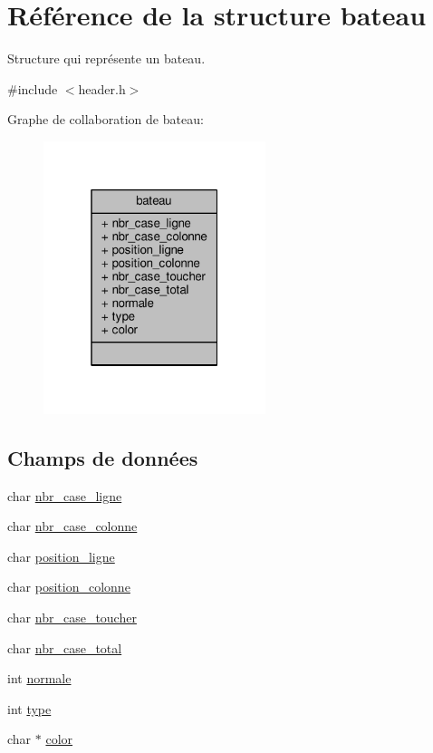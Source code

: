 \hypertarget{structbateau}{}\section{Référence de la structure bateau}
\label{structbateau}


Structure qui représente un bateau.  




{\ttfamily \#include $<$header.\+h$>$}



Graphe de collaboration de bateau\+:\nopagebreak
\begin{figure}[H]
\begin{center}
\leavevmode
\includegraphics[width=184pt]{structbateau__coll__graph}
\end{center}
\end{figure}
\subsection*{Champs de données}
\begin{DoxyCompactItemize}
\item 
char \mbox{\hyperlink{structbateau_a5f7637b2932717e5589e1a368dd1b47b}{nbr\+\_\+case\+\_\+ligne}}
\item 
char \mbox{\hyperlink{structbateau_a1a56dd379e7c5cfc5714fd204947a0a8}{nbr\+\_\+case\+\_\+colonne}}
\item 
char \mbox{\hyperlink{structbateau_a5dcd33e534b9b1b8b0414325bc5c09b1}{position\+\_\+ligne}}
\item 
char \mbox{\hyperlink{structbateau_aac775edde7cde57176e580c29f6e8eca}{position\+\_\+colonne}}
\item 
char \mbox{\hyperlink{structbateau_a62ae80832c521a9984c520fde88dadfd}{nbr\+\_\+case\+\_\+toucher}}
\item 
char \mbox{\hyperlink{structbateau_aff445dc58a52069759f1e4bfd13c0313}{nbr\+\_\+case\+\_\+total}}
\item 
int \mbox{\hyperlink{structbateau_a77fe0bf7801ff08bf9b17e6c6237692e}{normale}}
\item 
int \mbox{\hyperlink{structbateau_ac4078d21fa180ff7d5c7e7fbf8a4a773}{type}}
\item 
char $\ast$ \mbox{\hyperlink{structbateau_a41910d4781ab6f3256d23f62b98c49a1}{color}}
\end{DoxyCompactItemize}


